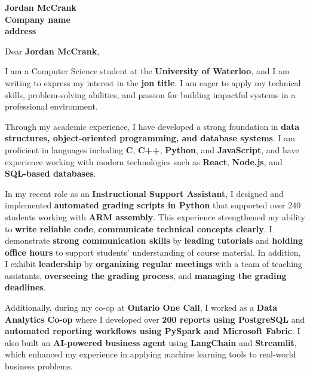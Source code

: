 \documentclass[11pt]{letter}
\date{} %
\newcommand{\hiringManager}{Jordan McCrank}
\newcommand{\companyName}{Company name}
\newcommand{\companyAddress}{address}
\newcommand{\jobTitle}{jon title}
\begin{document}
\vspace{-1em}

\begin{letter}{\textbf{\hiringManager \\ \companyName \\ \companyAddress}}

\opening{Dear \textbf{ \hiringManager},}

\onehalfspacing

\hspace*{1cm} I am a Computer Science student at the \textbf{University of Waterloo}, and I am writing to express my interest in the\textbf{ \jobTitle}. I am eager to apply my technical skills, problem-solving abilities, and passion for building impactful systems in a professional environment.

\hspace*{1cm} Through my academic experience, I have developed a strong foundation in \textbf{data structures, object-oriented programming, and database systems}. I am proficient in languages including \textbf{C}, \textbf{C++}, \textbf{Python}, and \textbf{JavaScript}, and have experience working with modern technologies such as \textbf{React}, \textbf{Node.js}, and \textbf{SQL-based databases}.

\hspace*{1cm} In my recent role as an \textbf{Instructional Support Assistant}, I designed and implemented \textbf{automated grading scripts in Python} that supported over 240 students working with \textbf{ARM assembly}. This experience strengthened my ability to \textbf{write reliable code}, \textbf{communicate technical concepts clearly}. I demonstrate \textbf{strong communication skills} by \textbf{leading tutorials} and \textbf{holding office hours} to support students’ understanding of course material. In addition, I exhibit \textbf{leadership} by \textbf{organizing regular meetings} with a team of teaching assistants, \textbf{overseeing the grading process}, and \textbf{managing the grading deadlines}.

\hspace*{1cm} Additionally, during my co-op at \textbf{Ontario One Call}, I worked as a \textbf{Data Analytics Co-op} where I developed over \textbf{200 reports using PostgreSQL} and \textbf{automated reporting workflows using PySpark and Microsoft Fabric}. I also built an \textbf{AI-powered business agent} using \textbf{LangChain} and \textbf{Streamlit}, which enhanced my experience in applying machine learning tools to real-world business problems.


\end{letter}
\end{document}
